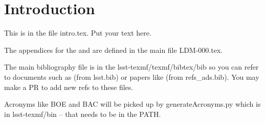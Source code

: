 \section{Introduction} \label{sec:intro}
This is in the file intro.tex. Put your text here.

The appendices for the  and  are defined in the main file LDM-000.tex.

The main bibliography file is in the lsst-texmf/texmf/bibtex/bib so you can refer to documents such as  (from lsst.bib)  or papers like \cite{2008arXiv0805.2366I} (from refs\_ads.bib). You may make a PR to add new refs to these files.

Acronyms like BOE and BAC will be picked up by generateAcronyms.py which is in lsst-texmf/bin -- that needs to be in the PATH.
